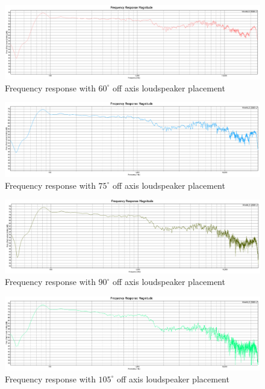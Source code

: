\documentclass{article}
\begin{document}
\begin{figure}[htbp]
\begin{center}
\includegraphics[width=15cm,keepaspectratio=true]{Figures/TaskBFR60deg}
\caption{Frequency response with $60^\circ$ off axis loudspeaker placement}
\label{fig:TaskBFR60deg}
\end{center}
\end{figure}
\begin{figure}[htbp]
\begin{center}
\includegraphics[width=15cm,keepaspectratio=true]{Figures/TaskBFR75deg}
\caption{Frequency response with $75^\circ$ off axis loudspeaker placement}
\label{fig:TaskBFR75deg}
\end{center}
\end{figure}
\begin{figure}[htbp]
\begin{center}
\includegraphics[width=15cm,keepaspectratio=true]{Figures/TaskBFR90deg}
\caption{Frequency response with $90^\circ$ off axis loudspeaker placement}
\label{fig:TaskBFR90deg}
\end{center}
\end{figure}
\begin{figure}[htbp]
\begin{center}
\includegraphics[width=15cm,keepaspectratio=true]{Figures/TaskBFR105deg}
\caption{Frequency response with $105^\circ$ off axis loudspeaker placement}
\label{fig:TaskBFR105deg}
\end{center}
\end{figure}
\end{document}
